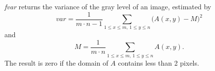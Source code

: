 {\em fvar} returns the variance of the gray level of an image, estimated by
$$var = \frac 1{m \cdot n-1} 
\sum_{1\leq x \leq m, \,1 \leq y \leq n} \big(A(x,y)-M\big)^2$$
and
$$M = \frac 1{m \cdot n} 
\sum_{1\leq x \leq m, \,1 \leq y \leq n} A(x,y).$$
The result is zero if the domain of $A$ contains less than 2 pixels.
